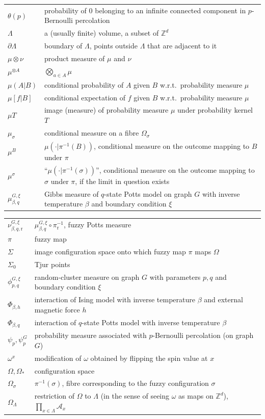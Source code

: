 \documentclass[12pt]{article}
\newcommand{\A}{\mathcal{A}}
\renewcommand{\r}{\mathrm{r}}
\newcommand{\Z}{\mathbb{Z}}
\newcommand{\pika}{\boldsymbol{\cdot}}
\newcommand{\1}{\mathbbm{1}}
\newcommand{\5}{\vspace{0.5cm}}
\theoremstyle{definition}
\begin{document}
\begin{tabular}{p{4cm}p{10cm}}
$\theta(p)$ & probability of $0$ belonging to an infinite connected component in $p$-Bernoulli percolation \\
$\Lambda$ & a (usually finite) volume, a subset of $\Z^d$ \\
$\partial\Lambda$ & boundary of $\Lambda$, points outside $\Lambda$ that are adjacent to it \\
$\mu\otimes\nu$ & product measure of $\mu$ and $\nu$ \\
$\mu^{\otimes A}$ & $\bigotimes_{a\in A}\mu$ \\
$\mu(A|B)$ & conditional probability of $A$ given $B$ w.r.t.~probability measure $\mu$ \\
$\mu[f|B]$ & conditional expectation of $f$ given $B$ w.r.t.~probability measure $\mu$ \\
$\mu T$ & image (measure) of probability measure $\mu$ under probability kernel $T$ \\
$\mu_\sigma$ & conditional measure on a fibre $\Omega_\sigma$ \\
$\mu^B$ & $\mu(\pika|\pi^{-1}(B))$, conditional measure on the outcome mapping to $B$ under $\pi$ \\
$\mu^\sigma$ & ``$\mu(\pika|\pi^{-1}(\sigma))$'', conditional measure on the outcome mapping to $\sigma$ under $\pi$, if the limit in question exists \\
$\mu_{\beta,q}^{G,\xi}$ & Gibbs measure of $q$-state Potts model on graph $G$ with inverse temperature $\beta$ and boundary condition $\xi$ 
\end{tabular}

\pagebreak

\begin{tabular}{p{4cm}p{10cm}}

$\nu_{\beta,q,\r}^{G,\xi}$ & $\mu_{\beta,q}^{G,\xi}\circ\pi_\r^{-1}$, fuzzy Potts measure \\
$\pi$ & fuzzy map \\
$\Sigma$ & image configuration space onto which fuzzy map $\pi$ maps $\Omega$ \\
$\Sigma_0$ & Tjur points \\
$\phi_{p,q}^{G,\xi}$ & random-cluster measure on graph $G$ with parameters $p,q$ and boundary condition $\xi$ \\
$\Phi_{\beta,h}$ & interaction of Ising model with inverse temperature $\beta$ and external magnetic force $h$ \\
$\Phi_{\beta,q}$ & interaction of $q$-state Potts model with inverse temperature $\beta$ \\
$\psi_p,\psi_p^G$ & probability measure associated with $p$-Bernoulli percolation (on graph $G$) \\
$\omega^x$ & modification of $\omega$ obtained by flipping the spin value at $x$ \\ 
$\Omega,\Omega_*$ & configuration space \\
$\Omega_\sigma$ & $\pi^{-1}(\sigma)$, fibre corresponding to the fuzzy configuration $\sigma$ \\
$\Omega_\Lambda$ & restriction of $\Omega$ to $\Lambda$ (in the sense of seeing $\omega$ as maps on $\Z^d$), $\prod_{x\in\Lambda}\A_x$
\end{tabular}
\end{document}

